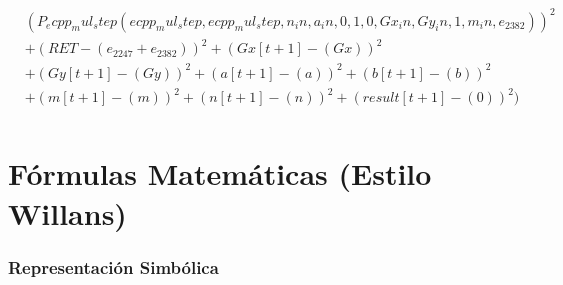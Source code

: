 \documentclass[10pt, a4paper]{article}
\begin{document}
\begin{small}
\begin{align*}
& (P_ecpp_mul_step(ecpp_mul_step, ecpp_mul_step, n_in, a_in, 0, 1, 0, Gx_in, Gy_in, 1, m_in, e_{2382}))^{2} \\
& + (RET - (e_{2247} + e_{2382}))^{2} + (Gx[t+1] - (Gx))^{2} \\
& + (Gy[t+1] - (Gy))^{2} + (a[t+1] - (a))^{2} + (b[t+1] - (b))^{2} \\
& + (m[t+1] - (m))^{2} + (n[t+1] - (n))^{2} + (result[t+1] - (0))^{2}) \\
\end{align*}
\end{small}\part{Fórmulas Matemáticas (Estilo Willans)}
\section{Representación Simbólica}
\end{document}
